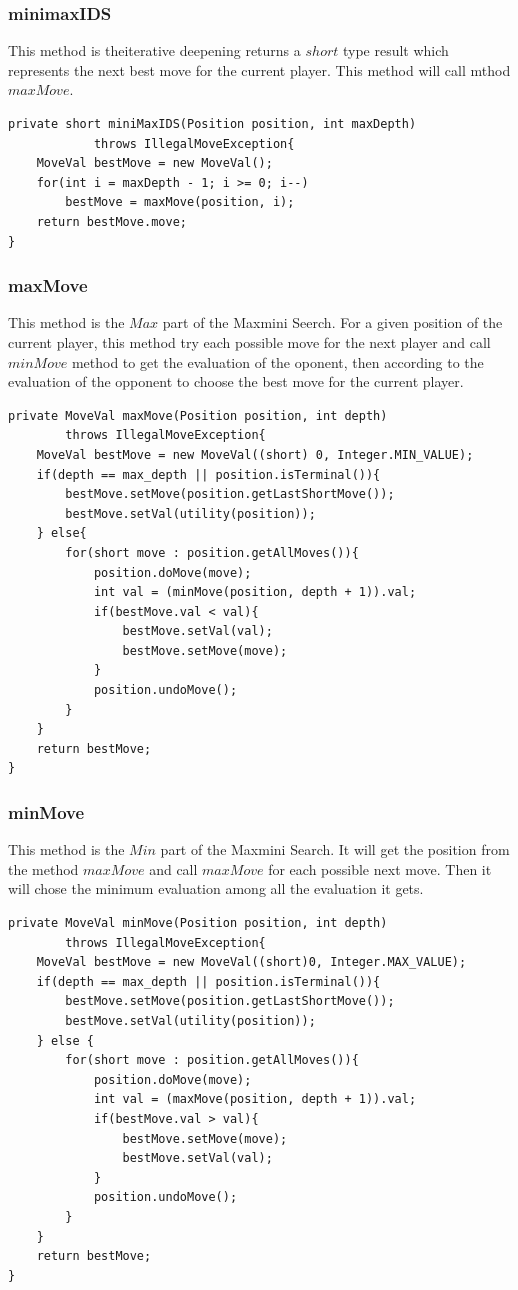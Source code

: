 \documentclass{article}
\begin{document}
\subsubsection{minimaxIDS}
This method is theiterative deepening returns a $short$ type result which represents the next best move for the current player. This method will call mthod $maxMove$.
\begin{lstlisting}
private short miniMaxIDS(Position position, int maxDepth) 
			throws IllegalMoveException{
	MoveVal bestMove = new MoveVal();
	for(int i = maxDepth - 1; i >= 0; i--)
		bestMove = maxMove(position, i);
	return bestMove.move;
}
\end{lstlisting}

\subsubsection{maxMove}
This method is the $Max$ part of the Maxmini Seerch. For a given position of the current player, this method try each possible move for the next player and call $minMove$ method to get the evaluation of the oponent, then according to the evaluation of the opponent to choose the best move for the current player.
\begin{lstlisting}
private MoveVal maxMove(Position position, int depth) 
		throws IllegalMoveException{
	MoveVal bestMove = new MoveVal((short) 0, Integer.MIN_VALUE);
	if(depth == max_depth || position.isTerminal()){
		bestMove.setMove(position.getLastShortMove());
		bestMove.setVal(utility(position));
	} else{
		for(short move : position.getAllMoves()){
			position.doMove(move);
			int val = (minMove(position, depth + 1)).val;
			if(bestMove.val < val){
				bestMove.setVal(val);
				bestMove.setMove(move);
			}
			position.undoMove();
		}
	}
	return bestMove;	
}
\end{lstlisting}

\subsubsection{minMove}
This method is the $Min$ part of the Maxmini Search. It will get the position from the method $maxMove$ and call $maxMove$ for each possible next move. Then it will chose the minimum evaluation among all the evaluation it gets.
\begin{lstlisting}
private MoveVal minMove(Position position, int depth) 
		throws IllegalMoveException{
	MoveVal bestMove = new MoveVal((short)0, Integer.MAX_VALUE);
	if(depth == max_depth || position.isTerminal()){
		bestMove.setMove(position.getLastShortMove());
		bestMove.setVal(utility(position));
	} else {
		for(short move : position.getAllMoves()){
			position.doMove(move);
			int val = (maxMove(position, depth + 1)).val;
			if(bestMove.val > val){
				bestMove.setMove(move);
				bestMove.setVal(val);
			}
			position.undoMove();
		}
	}
	return bestMove;
}
\end{lstlisting}
\end{document}
